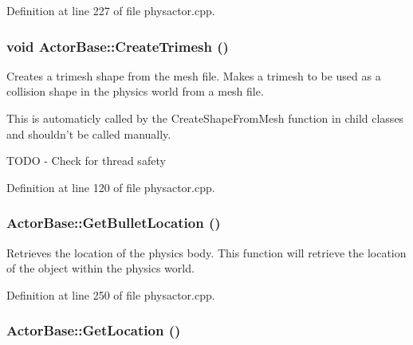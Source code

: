 Definition at line 227 of file physactor.cpp.\hypertarget{classActorBase_af7f0806222c79b5d5120dccefd93715e}{
\subsubsection[{CreateTrimesh}]{\setlength{\rightskip}{0pt plus 5cm}void ActorBase::CreateTrimesh ()}}
\label{dd/d7b/classActorBase_af7f0806222c79b5d5120dccefd93715e}


Creates a trimesh shape from the mesh file. Makes a trimesh to be used as a collision shape in the physics world from a mesh file. \par
 This is automaticly called by the CreateShapeFromMesh function in child classes and shouldn't be called manually. 

TODO -\/ Check for thread safety 

Definition at line 120 of file physactor.cpp.\hypertarget{classActorBase_ae84ff822d2f962360bf291bb2c88eb3e}{
\subsubsection[{GetBulletLocation}]{ ActorBase::GetBulletLocation ()}}
\label{dd/d7b/classActorBase_ae84ff822d2f962360bf291bb2c88eb3e}


Retrieves the location of the physics body. This function will retrieve the location of the object within the physics world. 

Definition at line 250 of file physactor.cpp.\hypertarget{classActorBase_a9dfdaf0304e4a462b3b033fb254116af}{
\subsubsection[{GetLocation}]{ ActorBase::GetLocation ()}}
\label{dd/d7b/classActorBase_a9dfdaf0304e4a462b3b033fb254116af}


